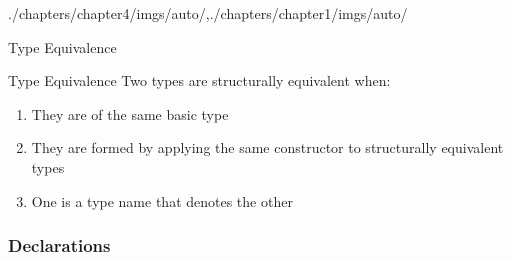 \begin{graphicspathcontext}{{./chapters/chapter4/imgs/auto/},{./chapters/chapter1/imgs/auto/}}
\begin{bibunit}[apalike]
\begin{frame}{Type Equivalence}
	\vspace{.25cm}
	\begin{definitionblock}{Type Equivalence}
		Two types are structurally equivalent when:
		\begin{enumerate}
		\item\label{def:type:equivalence:a}They are of the same basic type
		\item\label{def:type:equivalence:b}They are formed by applying the same constructor to structurally equivalent types
		\item One is a type name that denotes the other
		\end{enumerate}
	\end{definitionblock}
	\vspace{.25cm}
\end{frame}

\subsubsection{Declarations}
\subsubsectiontableofcontentslide


\end{bibunit}
\end{graphicspathcontext}
